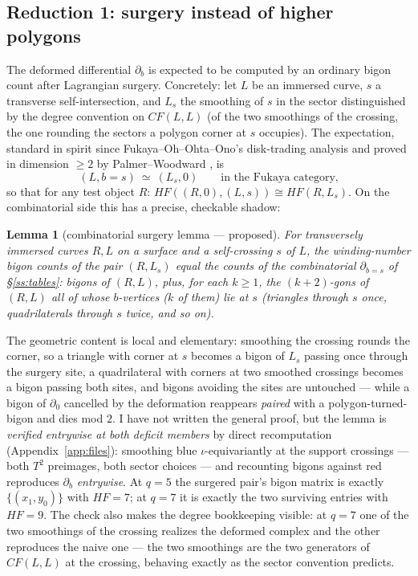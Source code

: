 \documentclass[11pt,reqno]{amsart}
\theoremstyle{plain}
\newtheorem{lemma}{Lemma}[section]
\theoremstyle{definition}
\newcommand{\HF}{\mathit{HF}}
\newcommand{\CF}{\mathit{CF}}
\newcommand{\bc}{b}
\begin{document}
\subsection{Reduction 1: surgery instead of higher polygons}\label{ss:surgery}
The deformed differential $\partial_\bc$ is expected to be computed by an ordinary bigon count
after Lagrangian surgery. Concretely: let $L$ be an immersed curve, $s$ a transverse
self-intersection, and $L_s$ the smoothing of $s$ in the sector distinguished by the degree
convention on $\CF(L,L)$ (of the two smoothings of the crossing, the one rounding the sectors
a polygon corner at $s$ occupies). The expectation, standard in spirit since
Fukaya--Oh--Ohta--Ono's disk-trading analysis and proved in dimension $\ge2$ by
Palmer--Woodward \cite{PW}, is
\[
   (L,\bc=s)\ \simeq\ (L_s,0)
   \qquad\text{in the Fukaya category,}
\]
so that for any test object $R$: $\HF((R,0),(L,s))\cong\HF(R,L_s)$. On the combinatorial side
this has a precise, checkable shadow:
\begin{lemma}[combinatorial surgery lemma --- proposed]\label{lem:surgery}
For transversely immersed curves $R,L$ on a surface and a self-crossing $s$ of $L$, the
winding-number bigon counts of the pair $(R,L_s)$ equal the counts of the combinatorial
$\partial_{\bc=s}$ of \S\ref{ss:tables}: bigons of $(R,L)$, plus, for each $k\ge1$, the
$(k{+}2)$-gons of $(R,L)$ all of whose $\bc$-vertices ($k$ of them) lie at $s$ (triangles
through $s$ once, quadrilaterals through $s$ twice, and so on).
\end{lemma}
The geometric content is local and elementary: smoothing the crossing rounds the corner, so a
triangle with corner at $s$ becomes a bigon of $L_s$ passing once through the surgery site,
a quadrilateral with corners at two smoothed crossings becomes a bigon passing both sites,
and bigons avoiding the sites are untouched --- while a bigon of $\partial_0$ cancelled by the
deformation reappears \emph{paired} with a polygon-turned-bigon and dies mod $2$. I have not
written the general proof, but the lemma is \emph{verified entrywise at both deficit
members} by direct recomputation (Appendix~\ref{app:files}): smoothing blue
$\iota$-equivariantly at the support crossings --- both $T^2$ preimages, both sector
choices --- and recounting bigons against red reproduces $\partial_\bc$ \emph{entrywise}. At
$q=5$ the surgered pair's bigon matrix is exactly $\{(x_1,y_0)\}$ with $\HF=7$; at $q=7$ it is
exactly the two surviving entries with $\HF=9$. The check also makes the degree bookkeeping
visible: at $q=7$ one of the two smoothings of the crossing realizes the deformed complex and
the other reproduces the naive one --- the two smoothings are the two generators of
$\CF(L,L)$ at the crossing, behaving exactly as the sector convention predicts.
\end{document}
